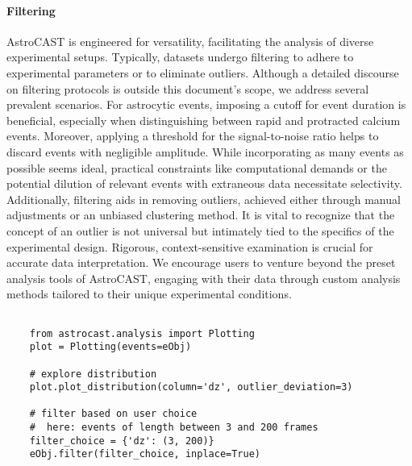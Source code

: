 
\paragraph{Filtering}
AstroCAST is engineered for versatility, facilitating the analysis of diverse experimental setups. Typically, datasets undergo filtering to adhere to experimental parameters or to eliminate outliers. Although a detailed discourse on filtering protocols is outside this document's scope, we address several prevalent scenarios. For astrocytic events, imposing a cutoff for event duration is beneficial, especially when distinguishing between rapid and protracted calcium events. Moreover, applying a threshold for the signal-to-noise ratio helps to discard events with negligible amplitude. While incorporating as many events as possible seems ideal, practical constraints like computational demands or the potential dilution of relevant events with extraneous data necessitate selectivity. Additionally, filtering aids in removing outliers, achieved either through manual adjustments or an unbiased clustering method. It is vital to recognize that the concept of an outlier is not universal but intimately tied to the specifics of the experimental design. Rigorous, context-sensitive examination is crucial for accurate data interpretation. We encourage users to venture beyond the preset analysis tools of AstroCAST, engaging with their data through custom analysis methods tailored to their unique experimental conditions.

\begin{lstlisting}[style=pyStyle]

    from astrocast.analysis import Plotting
    plot = Plotting(events=eObj)

    # explore distribution
    plot.plot_distribution(column='dz', outlier_deviation=3)

    # filter based on user choice
    #  here: events of length between 3 and 200 frames
    filter_choice = {'dz': (3, 200)}
    eObj.filter(filter_choice, inplace=True)

\end{lstlisting}

